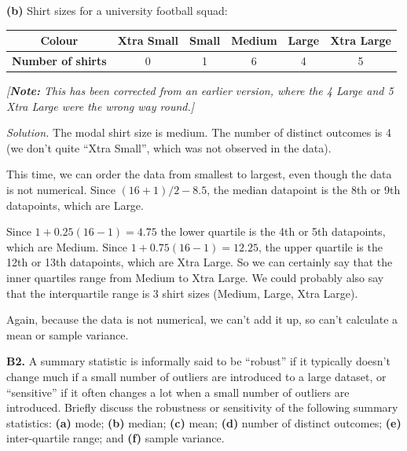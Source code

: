 \documentclass[
  a4paper,
]{book}
\theoremstyle{definition}
\theoremstyle{definition}
\theoremstyle{definition}
\theoremstyle{definition}
\theoremstyle{remark}
\begin{document}
\textbf{(b)} Shirt sizes for a university football squad:

\begin{longtable}[]{@{}cccccc@{}}
\toprule
\textbf{Colour} & Xtra Small & Small & Medium & Large & Xtra Large \\
\midrule
\endhead
\textbf{Number of shirts} & 0 & 1 & 6 & 4 & 5 \\
\bottomrule
\end{longtable}

\emph{{[}\textbf{Note:} This has been corrected from an earlier version, where the 4 Large and 5 Xtra Large were the wrong way round.{]}}

\begin{myanswers}
\emph{Solution.}
The modal shirt size is medium. The number of distinct outcomes is 4 (we don't quite ``Xtra Small'', which was not observed in the data).

This time, we can order the data from smallest to largest, even though the data is not numerical. Since \((16 + 1)/2 - 8.5\), the median datapoint is the 8th or 9th datapoints, which are Large.

Since \(1 + 0.25(16 - 1) = 4.75\) the lower quartile is the 4th or 5th datapoints, which are Medium. Since \(1 + 0.75(16-1) = 12.25\), the upper quartile is the 12th or 13th datapoints, which are Xtra Large. So we can certainly say that the inner quartiles range from Medium to Xtra Large. We could probably also say that the interquartile range is 3 shirt sizes (Medium, Large, Xtra Large).

Again, because the data is not numerical, we can't add it up, so can't calculate a mean or sample variance.

\end{myanswers}

\textbf{B2.} A summary statistic is informally said to be ``robust'' if it typically doesn't change much if a small number of outliers are introduced to a large dataset, or ``sensitive'' if it often changes a lot when a small number of outliers are introduced. Briefly discuss the robustness or sensitivity of the following summary statistics: \textbf{(a)} mode; \textbf{(b)} median; \textbf{(c)} mean; \textbf{(d)} number of distinct outcomes; \textbf{(e)} inter-quartile range; and \textbf{(f)} sample variance.
\end{document}
